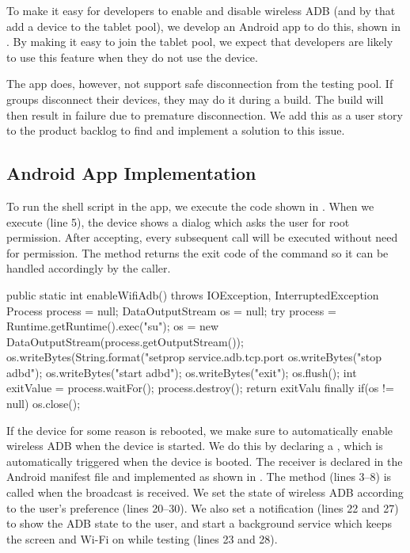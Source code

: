 To make it easy for developers to enable and disable wireless ADB (and by that add a device to the tablet pool), we develop an Android app to do this, shown in . By making it easy to join the tablet pool, we expect that developers are likely to use this feature when they do not use the device.

The app does, however, not support safe disconnection from the testing pool. If groups disconnect their devices, they may do it during a build. The build will then result in failure due to premature disconnection. We add this as a user story to the product backlog to find and implement a solution to this issue. 


\subsection{Android App Implementation}
To run the shell script in the app, we execute the code shown in . When we execute  (line 5), the device shows a dialog which asks the user for root permission. After accepting, every subsequent  call will be executed without need for permission. The method returns the exit code of the command so it can be handled accordingly by the caller.
\begin{javacode}[float=tb,label=lst:android_app_shell,caption=Enable wireless ADB in Android]
public static int enableWifiAdb() throws IOException, InterruptedException {
  Process process = null;
  DataOutputStream os = null;
  try {
    process = Runtime.getRuntime().exec("su");
    os = new DataOutputStream(process.getOutputStream());
    os.writeBytes(String.format("setprop service.adb.tcp.port %
    os.writeBytes("stop adbd\n");
    os.writeBytes("start adbd\n");
    os.writeBytes("exit\n");
    os.flush();
    int exitValue = process.waitFor();
    process.destroy();
    return exitValu
  } finally {
    if(os != null) {
      os.close();
    }
  }
}
\end{javacode}
If the device for some reason is rebooted, we make sure to automatically enable wireless ADB when the device is started. We do this by declaring a , which is automatically triggered when the device is booted. The receiver is declared in the Android manifest file and implemented as shown in . The  method (lines 3--8) is called when the broadcast is received. We set the state of wireless ADB according to the user's preference (lines 20--30). We also set a notification (lines 22 and 27) to show the ADB state to the user, and start a background service which keeps the screen and Wi-Fi on while testing (lines 23 and 28).

